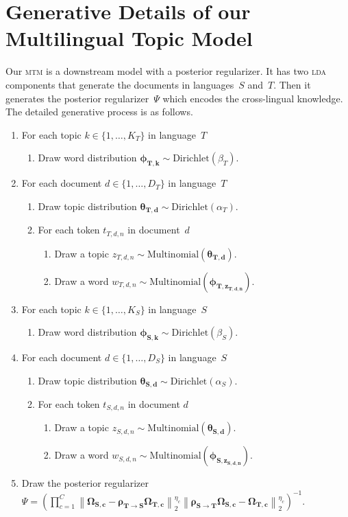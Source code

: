 \documentclass[paper=a4, fontsize=11pt]{article}
\newcommand{\lda}{\textsc{lda}\xspace}
\newcommand{\mtm}{\textsc{mtm}\xspace}
\begin{document}
\section{Generative Details of our Multilingual Topic Model}

Our \mtm is a downstream model with a posterior regularizer. It has two \lda components that generate the documents in languages~$S$ and~$T$. Then it generates the posterior regularizer~$\Psi$ which encodes the cross-lingual knowledge. The detailed generative process is as follows.
\begin{enumerate}[noitemsep]
  \item For each topic $k \in \{ 1, \ldots, K_T \}$ in language~$T$
  \begin{enumerate}
    \item Draw word distribution $\bm{\phi_{T,k}} \sim \text{Dirichlet} (\beta_T)$.
  \end{enumerate}
  \item For each document $d \in \{ 1, \ldots, D_T \}$ in language~$T$
  \begin{enumerate}
    \item Draw topic distribution $\bm{\theta_{T, d}} \sim \text{Dirichlet} (\alpha_T)$.
    \item For each token $t_{T,d,n}$ in document~$d$
    \begin{enumerate}
      \item Draw a topic $z_{T,d,n} \sim \text{Multinomial} (\bm{\theta_{T,d}})$.
      \item Draw a word $w_{T,d,n} \sim \text{Multinomial} (\bm{\phi_{T,z_{T,d,n}}})$.
    \end{enumerate}
  \end{enumerate}
  \item For each topic $k \in \{ 1, \ldots, K_S \}$ in language~$S$
  \begin{enumerate}
    \item Draw word distribution $\bm{\phi_{S,k}} \sim \text{Dirichlet} (\beta_S)$.
  \end{enumerate}
  \item For each document $d \in \{ 1, \ldots, D_S \}$ in language~$S$
  \begin{enumerate}
    \item Draw topic distribution $\bm{\theta_{S,d}} \sim \text{Dirichlet} (\alpha_S)$.
    \item For each token $t_{S,d,n}$ in document $d$
    \begin{enumerate}
      \item Draw a topic $z_{S,d,n} \sim \text{Multinomial} (\bm{\theta_{S,d}})$.
      \item Draw a word $w_{S,d,n} \sim \text{Multinomial} (\bm{\phi_{S,z_{S,d,n}}})$.
    \end{enumerate}
  \end{enumerate}
  \item Draw the posterior regularizer~$\Psi = \left( \prod_{c=1}^{C} \left\lVert \bm{\Omega_{S,c}} - \bm{\rho_{T \rightarrow S}} \bm{\Omega_{T,c}} \right\rVert_{2}^{\eta_c} \left\lVert \bm{\rho_{S \rightarrow T}} \bm{\Omega_{S,c}} - \bm{\Omega_{T,c}} \right\rVert_{2}^{\eta_c} \right)^{-1}$.
\end{enumerate}
\end{document}
